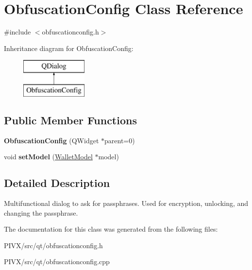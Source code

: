 \hypertarget{class_obfuscation_config}{}\section{Obfuscation\+Config Class Reference}
\label{class_obfuscation_config}


{\ttfamily \#include $<$obfuscationconfig.\+h$>$}

Inheritance diagram for Obfuscation\+Config\+:\begin{figure}[H]
\begin{center}
\leavevmode
\includegraphics[height=2.000000cm]{class_obfuscation_config}
\end{center}
\end{figure}
\subsection*{Public Member Functions}
\begin{DoxyCompactItemize}
\item 
\mbox{\label{class_obfuscation_config_ac94fd63ade751965b53de75df22aa499}} 
{\bfseries Obfuscation\+Config} (Q\+Widget $\ast$parent=0)
\item 
\mbox{\label{class_obfuscation_config_a508b1f36b1358567e7d0d506950dc75d}} 
void {\bfseries set\+Model} (\mbox{\hyperlink{class_wallet_model}{Wallet\+Model}} $\ast$model)
\end{DoxyCompactItemize}


\subsection{Detailed Description}
Multifunctional dialog to ask for passphrases. Used for encryption, unlocking, and changing the passphrase. 

The documentation for this class was generated from the following files\+:\begin{DoxyCompactItemize}
\item 
P\+I\+V\+X/src/qt/obfuscationconfig.\+h\item 
P\+I\+V\+X/src/qt/obfuscationconfig.\+cpp\end{DoxyCompactItemize}
